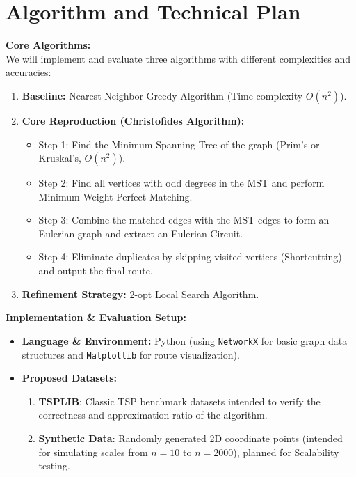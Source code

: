 \documentclass[10pt]{article}
\begin{document}
\section{Algorithm and Technical Plan}
\textbf{Core Algorithms:}\\
We will implement and evaluate three algorithms with different complexities and accuracies:
\begin{enumerate}
    \item \textbf{Baseline:} Nearest Neighbor Greedy Algorithm (Time complexity $O(n^2)$).
    \item \textbf{Core Reproduction (Christofides Algorithm):}
    \begin{itemize}
        \item Step 1: Find the Minimum Spanning Tree of the graph (Prim's or Kruskal's, $O(n^2)$).
        \item Step 2: Find all vertices with odd degrees in the MST and perform Minimum-Weight Perfect Matching.
        \item Step 3: Combine the matched edges with the MST edges to form an Eulerian graph and extract an Eulerian Circuit.
        \item Step 4: Eliminate duplicates by skipping visited vertices (Shortcutting) and output the final route.
    \end{itemize}
    \item \textbf{Refinement Strategy:} 2-opt Local Search Algorithm.
\end{enumerate}

\noindent\textbf{Implementation \& Evaluation Setup:}
\begin{itemize}
    \item \textbf{Language \& Environment:} Python (using \texttt{NetworkX} for basic graph data structures and \texttt{Matplotlib} for route visualization).
    \item \textbf{Proposed Datasets:}
    \begin{enumerate}
        \item \textbf{TSPLIB}: Classic TSP benchmark datasets intended to verify the correctness and approximation ratio of the algorithm.
        \item \textbf{Synthetic Data}: Randomly generated 2D coordinate points (intended for simulating scales from $n=10$ to $n=2000$), planned for Scalability testing.
    \end{enumerate}
\end{itemize}
\end{document}
